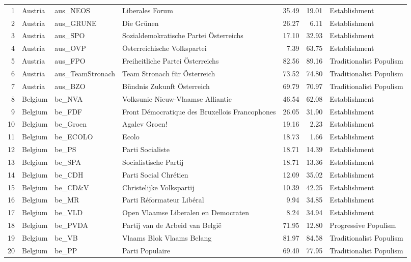 \begin{longtable}[c]{@{\extracolsep{\fill}}rlllrrl}
		1 & Austria & aus\_NEOS & Liberales Forum & 35.49 & 19.01 & Establishment \\
		2 & Austria & aus\_GRUNE & Die Grünen & 26.27 & 6.11 & Establishment \\
		3 & Austria & aus\_SPO & Sozialdemokratische Partei Österreichs & 17.10 & 32.93 & Establishment \\
		4 & Austria & aus\_OVP & Österreichische Volkspartei & 7.39 & 63.75 & Establishment \\
		5 & Austria & aus\_FPO & Freiheitliche Partei Österreichs & 82.56 & 89.16 & Traditionalist Populism \\
		6 & Austria & aus\_TeamStronach & Team Stronach für Österreich & 73.52 & 74.80 & Traditionalist Populism \\
		7 & Austria & aus\_BZO & Bündnis Zukunft Österreich & 69.79 & 70.97 & Traditionalist Populism \\
		8 & Belgium & be\_NVA & Volksunie Nieuw-Vlaamse Alliantie & 46.54 & 62.08 & Establishment \\
		9 & Belgium & be\_FDF & Front Démocratique des Bruxellois Francophones & 26.05 & 31.90 & Establishment \\
		10 & Belgium & be\_Groen & Agalev Groen! & 19.16 & 2.23 & Establishment \\
		11 & Belgium & be\_ECOLO & Ecolo & 18.73 & 1.66 & Establishment \\
		12 & Belgium & be\_PS & Parti Socialiste & 18.71 & 14.39 & Establishment \\
		13 & Belgium & be\_SPA & Socialistische Partij & 18.71 & 13.36 & Establishment \\
		14 & Belgium & be\_CDH & Parti Social Chrétien & 12.09 & 35.02 & Establishment \\
		15 & Belgium & be\_CD\&V & Christelijke Volkspartij & 10.39 & 42.25 & Establishment \\
		16 & Belgium & be\_MR & Parti Réformateur Libéral & 9.94 & 34.85 & Establishment \\
		17 & Belgium & be\_VLD & Open Vlaamse Liberalen en Democraten & 8.24 & 34.94 & Establishment \\
		18 & Belgium & be\_PVDA & Partij van de Arbeid van België & 71.95 & 12.80 & Progressive Populism \\
		19 & Belgium & be\_VB & Vlaams Blok Vlaams Belang & 81.97 & 84.58 & Traditionalist Populism \\
		20 & Belgium & be\_PP & Parti Populaire & 69.40 & 77.95 & Traditionalist Populism \\

\end{longtable}

